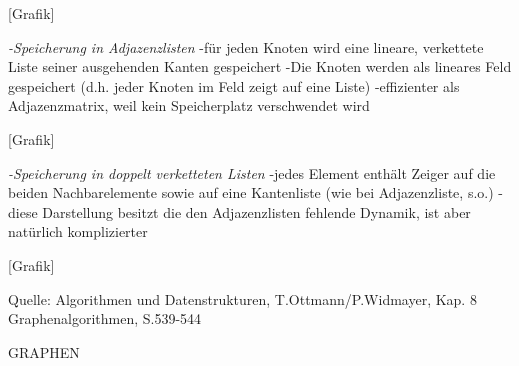  [Grafik]
 
\emph{-Speicherung in Adjazenzlisten}
-für jeden Knoten wird eine lineare, verkettete Liste seiner ausgehenden Kanten gespeichert
-Die Knoten werden als lineares Feld gespeichert (d.h. jeder Knoten im Feld zeigt auf eine Liste)
-effizienter als Adjazenzmatrix, weil kein Speicherplatz verschwendet wird

[Grafik]

\emph{-Speicherung in doppelt verketteten Listen}
-jedes Element enthält Zeiger auf die beiden Nachbarelemente sowie auf eine Kantenliste (wie bei Adjazenzliste, s.o.)
-diese Darstellung besitzt die den Adjazenzlisten fehlende Dynamik, ist aber natürlich komplizierter

[Grafik]

Quelle:
Algorithmen und Datenstrukturen, T.Ottmann/P.Widmayer, Kap. 8 Graphenalgorithmen, S.539-544

GRAPHEN